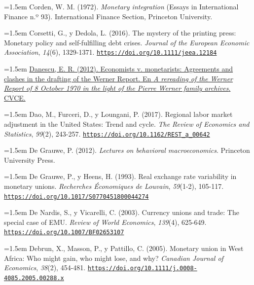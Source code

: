 \documentclass[10pt,a4paper]{article}
\begin{document}
\noindent\hangindent=1.5em Corden, W. M. (1972). \textit{Monetary integration} (Essays in International Finance n.º 93). International Finance Section, Princeton University.

\noindent\hangindent=1.5em Corsetti, G., y Dedola, L. (2016). The mystery of the printing press: Monetary policy and self-fulfilling debt crises. \textit{Journal of the European Economic Association}, \textit{14}(6), 1329-1371. \href{https://doi.org/10.1111/jeea.12184}{\nolinkurl{https://doi.org/10.1111/jeea.12184}}

\noindent\hangindent=1.5em \href{https://www.cvce.eu/content/publication/2012/4/3/875a85f1-e099-4013-acbf-68b2c50a6879/publishable_en.pdf}{Danescu, E. R. (2012). Economists v. monetarists: Agreements and clashes in the drafting of the Werner Report. En \textit{A rereading of the Werner Report of 8 October 1970 in the light of the Pierre Werner family archives}. CVCE.}

\noindent\hangindent=1.5em Dao, M., Furceri, D., y Loungani, P. (2017). Regional labor market adjustment in the United States: Trend and cycle. \textit{The Review of Economics and Statistics}, \textit{99}(2), 243-257. \href{https://doi.org/10.1162/REST_a_00642}{\nolinkurl{https://doi.org/10.1162/REST_a_00642}}

\noindent\hangindent=1.5em De Grauwe, P. (2012). \textit{Lectures on behavioral macroeconomics}. Princeton University Press.

\noindent\hangindent=1.5em De Grauwe, P., y Heens, H. (1993). Real exchange rate variability in monetary unions. \textit{Recherches Économiques de Louvain}, \textit{59}(1-2), 105-117. \href{https://doi.org/10.1017/S0770451800044274}{\nolinkurl{https://doi.org/10.1017/S0770451800044274}}

\noindent\hangindent=1.5em De Nardis, S., y Vicarelli, C. (2003). Currency unions and trade: The special case of EMU. \textit{Review of World Economics}, \textit{139}(4), 625-649. \href{https://doi.org/10.1007/BF02653107}{\nolinkurl{https://doi.org/10.1007/BF02653107}}

\noindent\hangindent=1.5em Debrun, X., Masson, P., y Pattillo, C. (2005). Monetary union in West Africa: Who might gain, who might lose, and why? \textit{Canadian Journal of Economics}, \textit{38}(2), 454-481. \href{https://doi.org/10.1111/j.0008-4085.2005.00288.x}{\nolinkurl{https://doi.org/10.1111/j.0008-4085.2005.00288.x}}
\end{document}
